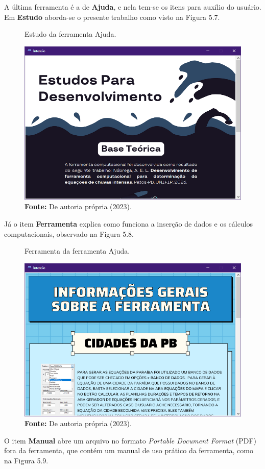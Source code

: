 A última ferramenta é a de \textbf{Ajuda}, e nela tem-se os itens para auxílio do usuário. Em \textbf{Estudo} aborda-se o presente trabalho como visto na Figura 5.7.

\begin{figure}[!ht]
	\centering
	\caption{Estudo da ferramenta Ajuda.}
	\includegraphics[width=.7625\linewidth]{figuras/estudo.png}
	\caption*{\textbf{Fonte:} De autoria própria (2023).}
	\label{fig:figuras/estudo.png}
\end{figure}

Já o item \textbf{Ferramenta} explica como funciona a inserção de dados e os cálculos computacionais, observado na Figura 5.8.

\begin{figure}[!ht]
	\centering
	\caption{Ferramenta da ferramenta Ajuda.}
	\includegraphics[width=.7625\linewidth]{figuras/ferramenta.png}
	\caption*{\textbf{Fonte:} De autoria própria (2023).}
	\label{fig:figuras/ferramenta.png}
\end{figure}

\newpage

O item \textbf{Manual} abre um arquivo no formato \textit{Portable Document Format} (PDF) fora da ferramenta, que contém um manual de uso prático da ferramenta, como na Figura 5.9.


